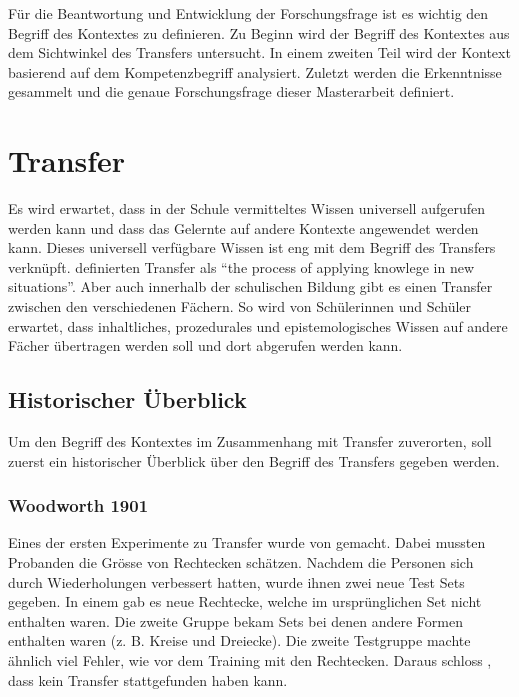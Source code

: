

Für die Beantwortung und Entwicklung der Forschungsfrage ist es wichtig den Begriff des Kontextes zu definieren. Zu Beginn wird der Begriff des Kontextes aus dem Sichtwinkel des Transfers untersucht. In einem zweiten Teil wird der Kontext basierend auf dem Kompetenzbegriff analysiert. Zuletzt werden die Erkenntnisse gesammelt und die genaue Forschungsfrage dieser Masterarbeit definiert.

\section{Transfer}

Es wird erwartet, dass in der Schule vermitteltes Wissen universell aufgerufen werden kann und dass das Gelernte auf andere Kontexte angewendet werden kann. Dieses universell verfügbare Wissen ist eng mit dem Begriff des Transfers verknüpft. \citet{Greeno1996} definierten Transfer als "`the process of applying knowlege in new situations"'. Aber auch innerhalb der schulischen Bildung gibt es einen Transfer zwischen den verschiedenen Fächern. So wird von Schülerinnen und Schüler erwartet, dass inhaltliches, prozedurales und epistemologisches Wissen auf andere Fächer übertragen werden soll und dort abgerufen werden kann.

\subsection{Historischer Überblick}

Um den Begriff des Kontextes im Zusammenhang mit Transfer zuverorten, soll zuerst ein historischer Überblick über den Begriff des Transfers gegeben werden.


\subsubsection{Woodworth 1901}

Eines der ersten Experimente zu Transfer wurde von \citet{Woodworth1901} gemacht. Dabei mussten Probanden die Grösse von Rechtecken schätzen. Nachdem die Personen sich durch Wiederholungen verbessert hatten, wurde ihnen zwei neue Test Sets gegeben. In einem gab es neue Rechtecke, welche im ursprünglichen Set nicht enthalten waren. Die zweite Gruppe bekam Sets bei denen andere Formen enthalten waren (z. B. Kreise und Dreiecke). Die zweite Testgruppe machte ähnlich viel Fehler, wie vor dem Training mit den Rechtecken. Daraus schloss \citeauthor{Woodworth1901}, dass kein Transfer stattgefunden haben kann.

